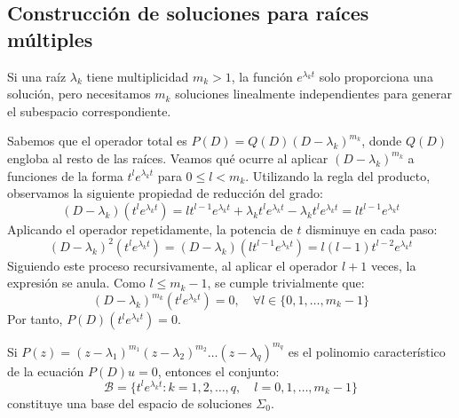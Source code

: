\subsection{Construcción de soluciones para raíces múltiples}

Si una raíz $\lambda_k$ tiene multiplicidad $m_k > 1$, la función $e^{\lambda_k t}$ solo proporciona una solución, pero necesitamos $m_k$ soluciones linealmente independientes para generar el subespacio correspondiente.

Sabemos que el operador total es $P(D) = Q(D)(D - \lambda_k)^{m_k}$, donde $Q(D)$ engloba al resto de las raíces. Veamos qué ocurre al aplicar $(D - \lambda_k)^{m_k}$ a funciones de la forma $t^l e^{\lambda_k t}$ para $0 \leq l < m_k$.
Utilizando la regla del producto, observamos la siguiente propiedad de reducción del grado:
\[
    (D - \lambda_k)(t^l e^{\lambda_k t}) = l t^{l-1} e^{\lambda_k t} + \lambda_k t^l e^{\lambda_k t} - \lambda_k t^l e^{\lambda_k t} = l t^{l-1} e^{\lambda_k t}
\]
Aplicando el operador repetidamente, la potencia de $t$ disminuye en cada paso:
\[
    (D - \lambda_k)^2 (t^l e^{\lambda_k t}) = (D - \lambda_k) (l t^{l-1} e^{\lambda_k t}) = l(l-1) t^{l-2} e^{\lambda_k t}
\]
Siguiendo este proceso recursivamente, al aplicar el operador $l+1$ veces, la expresión se anula. Como $l \leq m_k - 1$, se cumple trivialmente que:
\[
    (D - \lambda_k)^{m_k} (t^l e^{\lambda_k t}) = 0, \quad \forall l \in \{0, 1, \dots, m_k - 1\}
\]
Por tanto, $P(D) (t^l e^{\lambda_k t}) = 0$. 


\begin{teorema}
    Si $P(z) = (z-\lambda_1)^{m_1} (z-\lambda_2)^{m_2} \dots (z-\lambda_q)^{m_q}$ es el polinomio característico de la ecuación $P(D)u = 0$, entonces el conjunto:
    \[
        \mathcal{B} = \{ t^l e^{\lambda_k t} : k = 1, 2, \dots, q, \quad l = 0, 1, \dots, m_k - 1 \}
    \]
    constituye una base del espacio de soluciones $\Sigma_0$.
\end{teorema}

